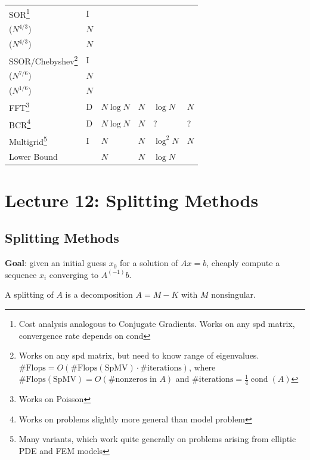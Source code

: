 \documentclass[11pt]{article}
\numberwithin{equation}{section}
\begin{document}
\begin{savenotes}
\begin{table}[H]
\begin{tabular}{|l|l|l|l|l|l|}
            SOR\footnote{Cost analysis analogous to Conjugate Gradients. Works on any spd matrix, convergence rate depends on cond} & I & \makecell[l]{$N^{3/2}$ \\ ($N^{4/3}$)} & $N$ & \makecell[l]{$N^{1/2}$ \\ ($N^{4/3}$)} & $N$ \\ \hline
            SSOR/Chebyshev\footnote{Works on any spd matrix, but need to know range of eigenvalues. $\#\text{Flops}=O(\#\text{Flops}(\text{SpMV}) \cdot \#\text{iterations})$, where $\#\text{Flops}(\text{SpMV})=O(\#\text{nonzeros in }A)$ and $\#\text{iterations}=\frac{1}{4}\operatorname{cond}(A)$} & I & \makecell[l]{$N^{5/4}$ \\ ($N^{7/6}$)} & $N$ & \makecell[l]{$N^{1/4}$ \\ ($N^{1/6}$)} & $N$ \\ \hline
            FFT\footnote{Works on Poisson} & D & $N \log N$ & $N$ & $\log N$ & $N$ \\ \hline
            BCR\footnote{Works on problems slightly more general than model problem} & D & $N \log N$ & $N$ & ? & ? \\ \hline
            Multigrid\footnote{Many variants,  which work quite generally on problems arising from elliptic PDE and FEM models} & I & $N$ & $N$ & $\log^2 N$ & $N$ \\ \hline
            Lower Bound &  & $N$ & $N$ & $\log N$ &  \\ \hline
        \end{tabular}
    \end{table}
\end{savenotes}

\newpage
\section{Lecture 12: Splitting Methods}
\subsection{Splitting Methods}
\textbf{Goal}: given an initial guess $x_0$ for a solution of $Ax=b$, cheaply compute a sequence $x_i$ converging to $A^(-1)b$.

\begin{definition}
    A splitting of $A$ is a decomposition $A = M - K$ with $M$ nonsingular.
\end{definition}
\end{document}
